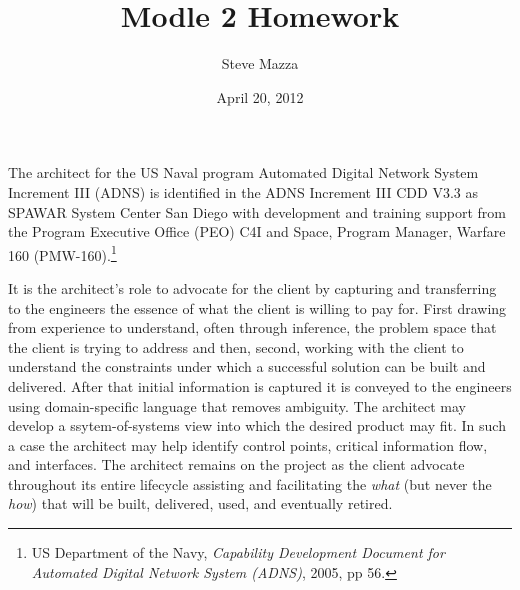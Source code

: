 \documentclass[letterpaper,12pt]{article}
\title{Modle 2 Homework}
\author{Steve Mazza}
\date{April 20, 2012}
\begin{document}
\maketitle




The architect for the US Naval program Automated Digital Network System Increment III (ADNS) is identified in the ADNS Increment III CDD V3.3 as SPAWAR System Center San Diego with development and training support from the Program Executive Office (PEO) C4I and Space, Program Manager, Warfare 160 (PMW-160).\footnote{US Department of the Navy, \emph{Capability Development Document for Automated Digital Network System (ADNS)}, 2005, pp 56.}

It is the architect's role to advocate for the client by capturing and transferring to the engineers the essence of what the client is willing to pay for.  First drawing from experience to understand, often through inference, the problem space that the client is trying to address and then, second, working with the client to understand the constraints under which a successful solution can be built and delivered.  After that initial information is captured it is conveyed to the engineers using domain-specific language that removes ambiguity.  The architect may develop a ssytem-of-systems view into which the desired product may fit.  In such a case the architect may help identify control points, critical information flow, and interfaces.  The architect remains on the project as the client advocate throughout its entire lifecycle assisting and facilitating the \emph{what} (but never the \emph{how}) that will be built, delivered, used, and eventually retired.
\end{document}
